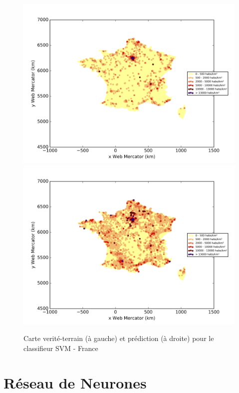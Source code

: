 \documentclass{book}
\begin{document}
\begin{figure}[H]
\centerline{
\includegraphics[scale=0.5]{../../data/France/test/Support_Vector_Gaussian_Classification/Support_Vector_Gaussian_Classification/density_ground_truth.png}
\includegraphics[scale=0.5]{../../data/France/test/Support_Vector_Gaussian_Classification/Support_Vector_Gaussian_Classification/density_classification.png}
}
\caption{Carte verité-terrain (à gauche) et prédiction (à droite) pour le classifieur SVM - France}
\label{svm_carte}
\end{figure}

\section{Réseau de Neurones}
\end{document}

